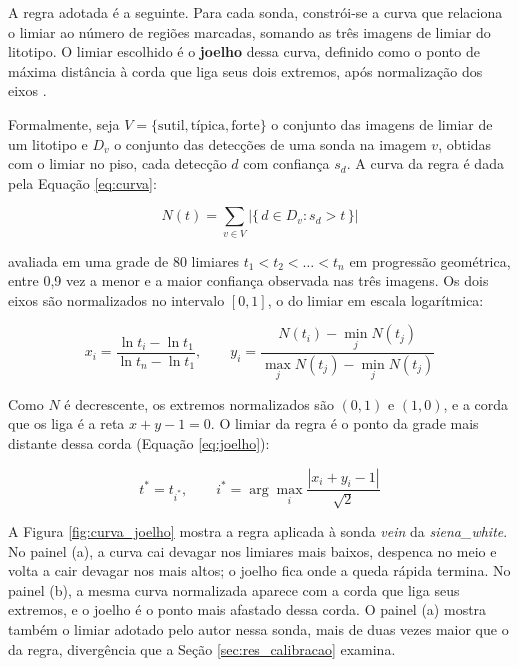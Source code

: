 A regra adotada é a seguinte. Para cada sonda, constrói-se a curva que relaciona o limiar ao número de regiões marcadas, somando as três imagens de limiar do litotipo. O limiar escolhido é o \textbf{joelho} dessa curva, definido como o ponto de máxima distância à corda que liga seus dois extremos, após normalização dos eixos \cite{kneedle_satopaa2011}.

Formalmente, seja $V = \{\text{sutil}, \text{típica}, \text{forte}\}$ o conjunto das imagens de limiar de um litotipo e $D_v$ o conjunto das detecções de uma sonda na imagem $v$, obtidas com o limiar no piso, cada detecção $d$ com confiança $s_d$. A curva da regra é dada pela Equação \ref{eq:curva}:

\begin{equation}
  N(t) = \sum_{v \in V} \left| \{\, d \in D_v : s_d > t \,\} \right|
  \label{eq:curva}
\end{equation}

\noindent avaliada em uma grade de 80 limiares $t_1 < t_2 < \dots < t_n$ em progressão geométrica, entre 0,9 vez a menor e a maior confiança observada nas três imagens. Os dois eixos são normalizados no intervalo $[0, 1]$, o do limiar em escala logarítmica:

\begin{equation}
  x_i = \frac{\ln t_i - \ln t_1}{\ln t_n - \ln t_1}, \qquad
  y_i = \frac{N(t_i) - \min_j N(t_j)}{\max_j N(t_j) - \min_j N(t_j)}
  \label{eq:normalizacao}
\end{equation}

\noindent Como $N$ é decrescente, os extremos normalizados são $(0, 1)$ e $(1, 0)$, e a corda que os liga é a reta $x + y - 1 = 0$. O limiar da regra é o ponto da grade mais distante dessa corda (Equação \ref{eq:joelho}):

\begin{equation}
  t^{*} = t_{i^{*}}, \qquad
  i^{*} = \arg\max_{i} \frac{\left| x_i + y_i - 1 \right|}{\sqrt{2}}
  \label{eq:joelho}
\end{equation}

A Figura \ref{fig:curva_joelho} mostra a regra aplicada à sonda \textit{vein} da \textit{siena\_white}. No painel (a), a curva cai devagar nos limiares mais baixos, despenca no meio e volta a cair devagar nos mais altos; o joelho fica onde a queda rápida termina. No painel (b), a mesma curva normalizada aparece com a corda que liga seus extremos, e o joelho é o ponto mais afastado dessa corda. O painel (a) mostra também o limiar adotado pelo autor nessa sonda, mais de duas vezes maior que o da regra, divergência que a Seção \ref{sec:res_calibracao} examina.

